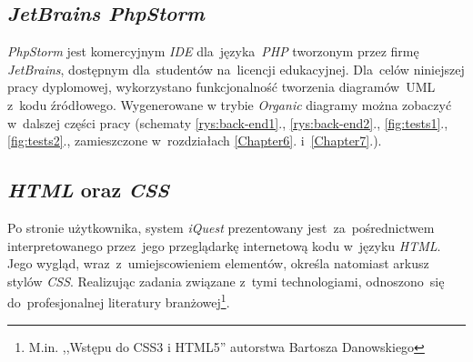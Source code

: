 \subsection{\textit{JetBrains PhpStorm}}
\label{Chapter63a}

\textit{PhpStorm} jest komercyjnym \textit{IDE} dla~języka~\textit{PHP} tworzonym przez firmę \textit{JetBrains}, dostępnym dla~studentów na~licencji edukacyjnej. Dla~celów niniejszej pracy dyplomowej, wykorzystano funkcjonalność tworzenia diagramów~UML z~kodu źródłowego. Wygenerowane w trybie \textit{Organic} diagramy można zobaczyć w~dalszej części pracy (schematy \ref{rys:back-end1}., \ref{rys:back-end2}., \ref{fig:tests1}., \ref{fig:tests2}., zamieszczone w~rozdziałach \ref{Chapter6}. i~\ref{Chapter7}.).

\subsection{\textit{HTML} oraz \textit{CSS}}
\label{Chapter63b}
Po stronie użytkownika, system \textit{iQuest} prezentowany jest~za~pośrednictwem interpretowanego przez~jego przeglądarkę internetową kodu w~języku \textit{HTML}. Jego wygląd, wraz~z~umiejscowieniem elementów, określa natomiast arkusz stylów \textit{CSS}. Realizując zadania związane z~tymi technologiami, odnoszono~się do~profesjonalnej literatury branżowej\footnote{M.in. ,,Wstępu do CSS3 i HTML5'' autorstwa Bartosza Danowskiego\cite{BD:WdCiH11}}.